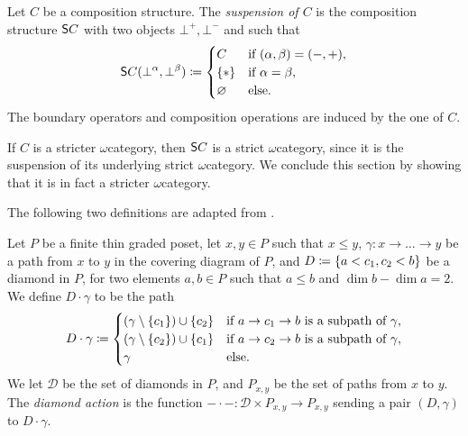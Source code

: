 \begin{dfn} [Suspension]
    Let \( C \) be a composition structure.
    The \emph{suspension of \( C \)} is the composition structure \( \mathsf{S}{C} \) with two objects \( \bot^+, \bot^- \) and such that
    \begin{equation*}
        \mathsf{S}{C}(\bot^\alpha, \bot^\beta) \coloneqq 
        \begin{cases}
            C       & \text{if } (\alpha, \beta) = (-, +),\\
            \left\{ {*} \right\} & \text{if } \alpha = \beta,\\
            \varnothing & \text{else.}
        \end{cases}
    \end{equation*}
    The boundary operators and composition operations are induced by the one of \( C \). 
\end{dfn}

\noindent If \( C \) is a stricter \( \omega \)\nbd category, then \( \mathsf{S}{C} \) is a strict \( \omega \)\nbd category, since it is the suspension of its underlying strict \( \omega \)\nbd category.
We conclude this section by showing that it is in fact a stricter \( \omega \)\nbd category. 

The following two definitions are adapted from \cite{chandler2019thin}.
\begin{dfn} 
    Let \( P \) be a finite thin graded poset, let \( x, y \in P \) such that \( x \le y \), \( \gamma \colon x \to \ldots \to y \) be a path from \( x \) to \( y \) in the covering diagram of \( P \), and \( D \coloneqq \left\{ {a < c_1, c_2 < b} \right\} \) be a diamond in \( P \), for two elements \( a, b \in P \) such that \( a \le b \) and \( \dim b - \dim a = 2 \).
    We define \( D\cdot \gamma \) to be the path
    \begin{equation*}
        D \cdot \gamma \coloneqq 
        \begin{cases}
            (\gamma \setminus \left\{ {c_1} \right\}) \cup \left\{ {c_2} \right\} & \text{if } a \to c_1 \to b \text{ is a subpath of } \gamma, \\
            (\gamma \setminus \left\{ {c_2} \right\}) \cup \left\{ {c_1} \right\} & \text{if } a \to c_2 \to b \text{ is a subpath of } \gamma, \\
            \gamma & \text{else.}
        \end{cases}
    \end{equation*} 
    We let \( \mathcal{D} \) be the set of diamonds in \( P \), and \( P_{x, y} \) be the set of paths from \( x \) to \( y \).
    The \emph{diamond action} is the function \( - \cdot - \colon \mathcal{D} \times P_{x, y} \to P_{x, y} \) sending a pair \( (D, \gamma) \) to \( D \cdot \gamma \).
\end{dfn}

